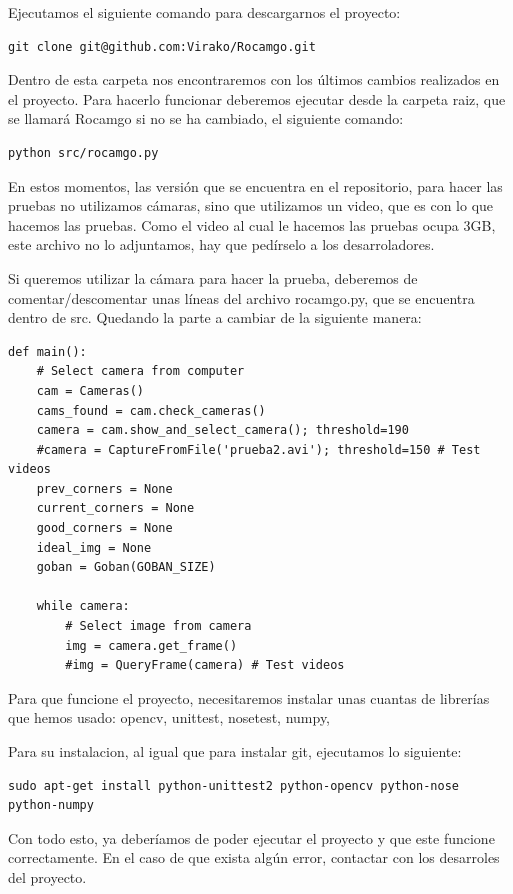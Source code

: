 \documentclass[12pt,a4paper]{report}
\begin{document}
Ejecutamos el siguiente comando para descargarnos el proyecto: 

\begin{verbatim}
git clone git@github.com:Virako/Rocamgo.git
\end{verbatim}

Dentro de esta carpeta nos encontraremos con los últimos cambios realizados en
el proyecto. Para hacerlo funcionar deberemos ejecutar desde la carpeta raiz,
que se llamará Rocamgo si no se ha cambiado, el siguiente comando:

\begin{verbatim}
python src/rocamgo.py
\end{verbatim}

En estos momentos, las versión que se encuentra en el repositorio, para hacer
las pruebas no utilizamos cámaras, sino que utilizamos un video, que es con lo
que hacemos las pruebas. Como el video al cual le hacemos las pruebas ocupa 3GB,
este archivo no lo adjuntamos, hay que pedírselo a los desarroladores. 

Si queremos utilizar la cámara para hacer la prueba, deberemos de
comentar/descomentar unas líneas del archivo rocamgo.py, que se encuentra dentro
de src. Quedando la parte a cambiar de la siguiente manera: 

\begin{verbatim}
def main():
    # Select camera from computer
    cam = Cameras()
    cams_found = cam.check_cameras()
    camera = cam.show_and_select_camera(); threshold=190
    #camera = CaptureFromFile('prueba2.avi'); threshold=150 # Test videos
    prev_corners = None
    current_corners = None
    good_corners = None
    ideal_img = None
    goban = Goban(GOBAN_SIZE)

    while camera: 
        # Select image from camera 
        img = camera.get_frame()
        #img = QueryFrame(camera) # Test videos
\end{verbatim}

Para que funcione el proyecto, necesitaremos instalar unas cuantas de librerías
que hemos usado: opencv, unittest, nosetest, numpy, 

Para su instalacion, al igual que para instalar git, ejecutamos lo siguiente:

\begin{verbatim}
sudo apt-get install python-unittest2 python-opencv python-nose python-numpy
\end{verbatim}

Con todo esto, ya deberíamos de poder ejecutar el proyecto y que este funcione
correctamente. En el caso de que exista algún error, contactar con los
desarroles del proyecto. 
\end{document}

